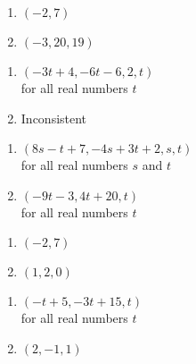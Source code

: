 \documentclass{ximera}
\begin{document}
\begin{multicols}{2}
\begin{enumerate}
\setcounter{enumi}{\value{HW}}

\item $(-2, 7)$
\item $(-3, 20, 19)$

\setcounter{HW}{\value{enumi}}
\end{enumerate}
\end{multicols}


\begin{multicols}{2}
\begin{enumerate}
\setcounter{enumi}{\value{HW}}

\item $(-3t + 4, -6t - 6, 2, t)$ \\
for all real numbers $t$
\item Inconsistent


\setcounter{HW}{\value{enumi}}
\end{enumerate}
\end{multicols}


\begin{multicols}{2}
\begin{enumerate}
\setcounter{enumi}{\value{HW}}


\item $(8s - t + 7, -4s + 3t + 2, s, t)$ \\ for all real numbers $s$ and $t$
\item $(-9t - 3, 4t + 20, t)$ \\ for all real numbers $t$


\setcounter{HW}{\value{enumi}}
\end{enumerate}
\end{multicols}


\begin{multicols}{2}
\begin{enumerate}
\setcounter{enumi}{\value{HW}}

\item $(-2, 7)$
\item $(1, 2, 0)$

\setcounter{HW}{\value{enumi}}
\end{enumerate}
\end{multicols}


\begin{multicols}{2}
\begin{enumerate}
\setcounter{enumi}{\value{HW}}


\item $(-t + 5, -3t + 15, t)$\\
for all real numbers $t$
\item $(2,-1,1)$


\setcounter{HW}{\value{enumi}}
\end{enumerate}
\end{multicols}
\end{document}
